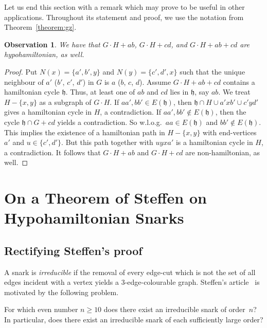 \documentclass{amcjoucc}
\newtheorem{observation}[thm]{Observation}
\begin{document}
Let us end this section with a remark which may prove to be useful in other applications. Throughout its statement and proof, we use the notation from Theorem~\ref{theorem:gz}.


\begin{observation}
We have that $G \cdot H + ab$, $G \cdot H + cd$, and $G \cdot H + ab + cd$ are hypohamiltonian, as well.
\end{observation}

\begin{proof}
Put $N(x) = \{ a', b', y \}$ and $N(y) = \{ c', d', x \}$ such that the unique neighbour of $a'$ ($b'$, $c'$, $d'$) in $G$ is $a$ ($b$, $c$, $d$). Assume $G \cdot H + ab + cd$ contains a hamiltonian cycle ${\mathfrak h}$. Thus, at least one of $ab$ and $cd$ lies in ${\mathfrak h}$, say $ab$. We treat $H - \{ x,y \}$ as a subgraph of $G \cdot H$. If $aa', bb' \in E({\mathfrak h})$, then ${\mathfrak h} \cap H \cup a'xb' \cup c'yd'$ gives a hamiltonian cycle in $H$, a contradiction. If $aa', bb' \notin E({\mathfrak h})$, then the cycle ${\mathfrak h} \cap G + cd$ yields a contradiction. So w.l.o.g.\ $aa \in E({\mathfrak h})$ and $bb' \notin E({\mathfrak h})$. This implies the existence of a hamiltonian path in $H - \{ x,y \}$ with end-vertices $a'$ and $u \in \{ c', d' \}$. But this path together with $uyxa'$ is a hamiltonian cycle in $H$, a contradiction. It follows that $G \cdot H + ab$ and $G \cdot H + cd$ are non-hamiltonian, as well.
\end{proof}


\section{On a Theorem of Steffen on Hypohamiltonian Snarks}
\label{sect:theorem_steffen}

\subsection{Rectifying Steffen's proof}
\label{subsect:fix_steffen}

A snark is \emph{irreducible} if the removal of every edge-cut which is not the set of all edges incident with a vertex yields a 3-edge-colourable graph. Steffen's article~\cite{St01} is motivated by the following problem.



\begin{problem}\label{problem:NS}
For which even number $n \ge 10$ does there exist an irreducible snark of order~$n$? In particular, does there exist an irreducible snark of each sufficiently large order?
\end{problem}
\end{document}
